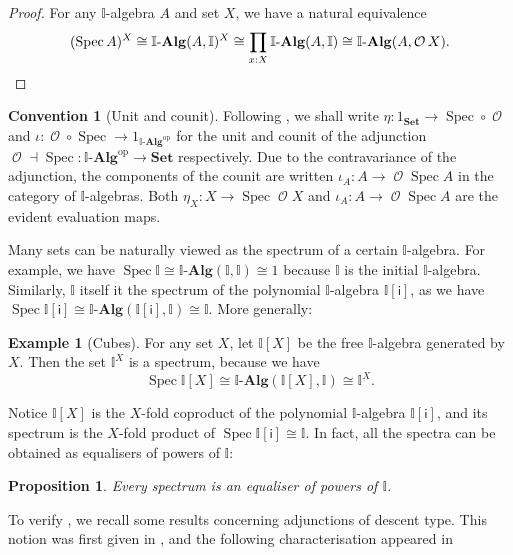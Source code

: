 \documentclass[a4paper,12pt]{amsart}
\newtheorem{proposition}[theorem]{Proposition}
\theoremstyle{definition}
\newtheorem{convention}[theorem]{Convention}
\newtheorem{example}[theorem]{Example}
\newcommand{\mc}[1]{\mathcal{#1}}
\newcommand{\mb}[1]{\mathbf{#1}}
\newcommand{\mbb}[1]{\mathbb{#1}}
\newcommand{\I}{\mbb I}
\newcommand{\ms}[1]{\mathsf{#1}}
\newcommand{\Set}{\mb{Set}}
\newcommand{\alg}{\text{-}\mb{Alg}}
\newcommand{\op}{^{\mathrm{op}}}
\newcommand{\spec}{\operatorname{Spec}}
\newcommand{\opens}{\operatorname{\mc{O}}} %
\begin{document}
\begin{proof}
  For any $\I$-algebra $A$ and set $X$, we have a natural equivalence 
  \[ (\spec A)^X \cong \I\alg(A,\I)^X \cong \prod_{x:X}\I\alg(A,\I)\cong \I\alg(A,\opens{X})\text{.} \qedhere\]
\end{proof}

\begin{convention}[Unit and counit]
  Following \citet{Taylor2011}, we shall write $\eta\colon 1_{\Set}\to \spec\circ\opens$ and $\iota\colon \opens\circ\spec\to 1_{\I\alg\op}$ for the unit and counit of the adjunction $\opens\dashv \spec\colon \I\alg\op\to \Set$ respectively. Due to the contravariance of the adjunction, the components of the counit are written $\iota_A\colon A\to \opens\spec{A}$ in the category of $\I$-algebras. Both $\eta_X\colon X\to \spec\opens{X}$ and $\iota_A\colon A\to \opens\spec{A}$ are the evident evaluation maps.
\end{convention}

Many sets can be naturally viewed as the spectrum of a certain $\I$-algebra. For example, we have $\spec \I \cong \I\alg(\I,\I) \cong 1$ because  $\I$ is the initial $\I$-algebra. Similarly, $\I$ itself it the spectrum of the polynomial $\I$-algebra $\I[\ms{i}]$, as we have $\spec \I[\ms{i}] \cong \I\alg(\I[\ms{i}],\I) \cong \I$. More generally:

\begin{example}[Cubes]\label{exm:cubeaffine}
  For any set $X$, let $\I[X]$ be the free $\I$-algebra generated by $X$. Then the set $\I^X$ is a spectrum, because we have
  \[ \spec \I[X] \cong \I\alg(\I[X],\I) \cong \I^X\text{.} \]
\end{example}

Notice $\I[X]$ is the $X$-fold coproduct of the polynomial $\I$-algebra $\I[\ms{i}]$, and its spectrum is the $X$-fold product of $\spec\I[\ms{i}] \cong \I$. In fact, all the spectra can be obtained as equalisers of powers of $\I$:

\begin{proposition}\label{prop:spectra-are-powers-of-the-interval}
  Every spectrum is an equaliser of powers of $\I$. 
\end{proposition}

To verify , we recall some results concerning adjunctions of descent type. This notion was first given in \citet{BarrMichael1985Ttat}, and the following characterisation appeared in \citet{kelly1993adjunctions}
\end{document}
